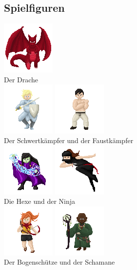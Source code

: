 \documentclass[10pt,a4paper,notitlepage]{scrreprt}
\begin{document}
\begin{flushleft}
\section{Spielfiguren}
\begin{center}
	\includegraphics[scale=2]{Dragon}\\
	Der Drache\\
		
	\includegraphics[scale=2]{Knight}
	\includegraphics[scale=2]{Fighter}\\
	Der Schwertkämpfer und der Faustkämpfer\\
	
	\includegraphics[scale=2]{Witch}
	\includegraphics[scale=3.5]{Ninja}\\
	Die Hexe und der Ninja\\
	
	\includegraphics[scale=2]{Archer}
	\includegraphics[scale=2]{Shaman}\\
	Der Bogenschütze und der Schamane\\


\end{center}
\end{flushleft}
\end{document}
